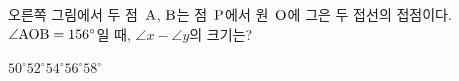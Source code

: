 \noindent\begin{minipage}[t]{0.58\linewidth}\vspace{0pt}\raggedright 오른쪽 그림에서 두 점~$\mathrm{A}$, $\mathrm{B}$는 점~$\mathrm{P}$에서 원~$\mathrm{O}$에 그은 두 접선의 접점이다. $\angle\mathrm{AOB}=156^\circ$일 때, $\angle x-\angle y$의 크기는?\end{minipage}\hfill\begin{minipage}[t]{0.4\linewidth}\vspace{0pt}\centering \resizebox{\ifdim\width>\linewidth\linewidth\else\width\fi}{!}{}\end{minipage}\par
\begin{choices32}{$50^\circ$}{$52^\circ$}{$54^\circ$}{$56^\circ$}{$58^\circ$}\end{choices32}
